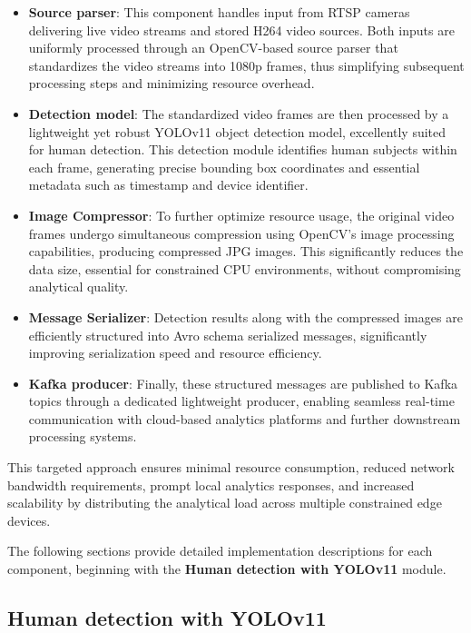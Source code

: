 \begin{itemize}
    \item \textbf{Source parser}: This component handles input from RTSP cameras delivering live video streams and stored H264 video sources. Both inputs are uniformly processed through an OpenCV-based source parser that standardizes the video streams into 1080p frames, thus simplifying subsequent processing steps and minimizing resource overhead.
    
    \item \textbf{Detection model}: The standardized video frames are then processed by a lightweight yet robust YOLOv11 object detection model, excellently suited for human detection. This detection module identifies human subjects within each frame, generating precise bounding box coordinates and essential metadata such as timestamp and device identifier.
    
    \item \textbf{Image Compressor}: To further optimize resource usage, the original video frames undergo simultaneous compression using OpenCV's image processing capabilities, producing compressed JPG images. This significantly reduces the data size, essential for constrained CPU environments, without compromising analytical quality.
    
    \item \textbf{Message Serializer}: Detection results along with the compressed images are efficiently structured into Avro schema serialized messages, significantly improving serialization speed and resource efficiency.
    
    \item \textbf{Kafka producer}: Finally, these structured messages are published to Kafka topics through a dedicated lightweight producer, enabling seamless real-time communication with cloud-based analytics platforms and further downstream processing systems.
\end{itemize}

This targeted approach ensures minimal resource consumption, reduced network bandwidth requirements, prompt local analytics responses, and increased scalability by distributing the analytical load across multiple constrained edge devices.

The following sections provide detailed implementation descriptions for each component, beginning with the \textbf{Human detection with YOLOv11} module.

\subsection{Human detection with YOLOv11}
\label{sec:edge_human_detection}

